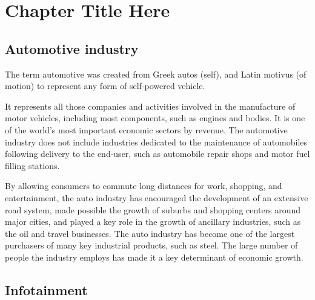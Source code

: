 
\chapter{Chapter Title Here} %

\label{Chapter3} %



\section{Automotive industry}

The term automotive was created from Greek autos (self), and Latin motivus (of motion) to represent any form of self-powered vehicle.

It represents all those companies and activities involved in the manufacture of motor vehicles, including most components, such as engines and bodies. It is one of the world's most important economic sectors by revenue. The automotive industry does not include industries dedicated to the maintenance of automobiles following delivery to the end-user, such as automobile repair shops and motor fuel filling stations.

By allowing consumers to commute long distances for work, shopping, and entertainment, the auto industry has encouraged the development of an extensive road system, made possible the growth of suburbs and shopping centers around major cities, and played a key role in the growth of ancillary industries, such as the oil and travel businesses. The auto industry has become one of the largest purchasers of many key industrial products, such as steel. The large number of people the industry employs has made it a key determinant of economic growth.




\section{Infotainment}

